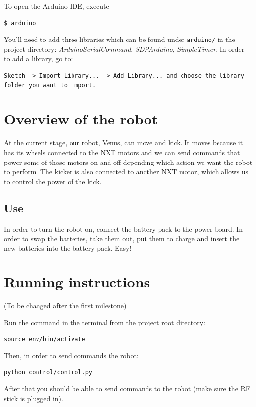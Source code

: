 \documentclass[12pt]{article}
\begin{document}
To open the Arduino IDE, execute:
\begin{lstlisting}
$ arduino
\end{lstlisting}

You'll need to add three libraries which can be found under \texttt{arduino/} in the project directory: \textit{ArduinoSerialCommand}, \textit{SDPArduino}, \textit{SimpleTimer}. In order to add a library, go to:
\begin{lstlisting}
Sketch -> Import Library... -> Add Library... and choose the library folder you want to import.
\end{lstlisting}

\section{Overview of the robot}

At the current stage, our robot, Venus, can move and kick. It moves because it
has its wheels connected to the NXT motors and we can send commands that power
some of those motors on and off depending which action we want the robot to
perform. The kicker is also connected to another NXT motor, which allows us to
control the power of the kick.

\subsection{Use}

In order to turn the robot on, connect the battery pack to the power board.
In order to swap the batteries, take them out, put them to charge and insert
the new batteries into the battery pack. Easy!

\section{Running instructions}

(To be changed after the first milestone)
\bigskip

Run the command in the terminal from the project root directory:
\begin{lstlisting}
source env/bin/activate
\end{lstlisting}
Then, in order to send commands the robot:
\begin{lstlisting}
python control/control.py
\end{lstlisting}
After that you should be able to send commands to the robot (make sure the RF stick is plugged in).
\bigskip
\end{document}
